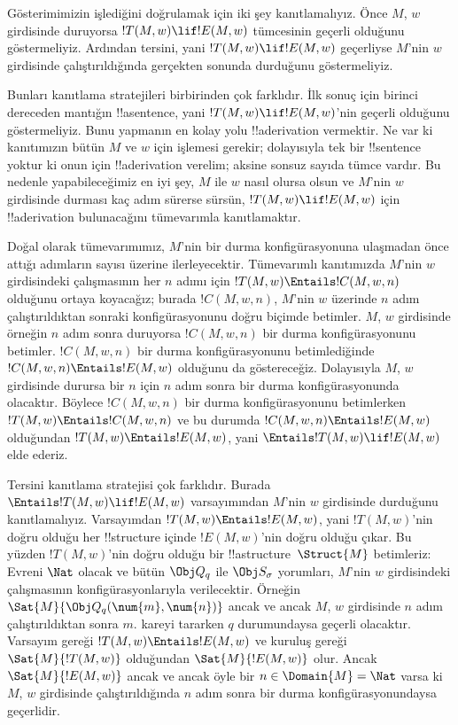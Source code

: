 \documentclass[../../../include/open-logic-section]{subfiles}
\begin{document}

\begin{explain}
Gösterimimizin işlediğini doğrulamak için iki şey kanıtlamalıyız. Önce $M$,
$w$ girdisinde duruyorsa $!T(M,w)\lif !E(M,w)$ tümcesinin geçerli olduğunu
göstermeliyiz. Ardından tersini, yani $!T(M,w)\lif !E(M,w)$ geçerliyse
$M$'nin $w$ girdisinde çalıştırıldığında gerçekten sonunda durduğunu
göstermeliyiz.

Bunları kanıtlama stratejileri birbirinden çok farklıdır. İlk sonuç için
birinci dereceden mantığın !!a{sentence}, yani $!T(M,w)\lif !E(M,w)$'nin
geçerli olduğunu göstermeliyiz. Bunu yapmanın en kolay yolu !!a{derivation}
vermektir. Ne var ki kanıtımızın bütün $M$ ve $w$ için işlemesi gerekir;
dolayısıyla tek bir !!{sentence} yoktur ki onun için !!a{derivation} verelim;
aksine sonsuz sayıda tümce vardır. Bu nedenle yapabileceğimiz en iyi şey,
$M$ ile
$w$ nasıl olursa olsun ve $M$'nin $w$ girdisinde durması kaç adım sürerse
sürsün, $!T(M,w)\lif !E(M,w)$ için !!a{derivation} bulunacağını tümevarımla
kanıtlamaktır.

Doğal olarak tümevarımımız, $M$'nin bir durma konfigürasyonuna ulaşmadan önce
attığı adımların sayısı üzerine ilerleyecektir. Tümevarımlı kanıtımızda
$M$'nin $w$ girdisindeki çalışmasının her $n$ adımı için
$!T(M,w)\Entails !C(M,w,n)$ olduğunu ortaya koyacağız; burada $!C(M,w,n)$,
$M$'nin $w$ üzerinde $n$ adım çalıştırıldıktan sonraki konfigürasyonunu doğru
biçimde betimler. $M$, $w$ girdisinde örneğin $n$ adım sonra duruyorsa
$!C(M,w,n)$ bir durma konfigürasyonunu betimler. $!C(M,w,n)$ bir durma
konfigürasyonunu betimlediğinde $!C(M,w,n)\Entails !E(M,w)$ olduğunu da
göstereceğiz. Dolayısıyla $M$, $w$ girdisinde durursa bir $n$ için $n$ adım
sonra bir durma konfigürasyonunda olacaktır. Böylece $!C(M,w,n)$ bir durma
konfigürasyonunu betimlerken $!T(M,w)\Entails !C(M,w,n)$ ve bu durumda
$!C(M,w,n)\Entails !E(M,w)$ olduğundan $!T(M,w)\Entails !E(M,w)$, yani
$\Entails !T(M,w)\lif !E(M,w)$ elde ederiz.

Tersini kanıtlama stratejisi çok farklıdır. Burada
$\Entails !T(M,w)\lif !E(M,w)$ varsayımından $M$'nin $w$ girdisinde durduğunu
kanıtlamalıyız. Varsayımdan $!T(M,w)\Entails !E(M,w)$, yani $!T(M,w)$'nin
doğru olduğu her !!{structure} içinde $!E(M,w)$'nin doğru olduğu çıkar.
Bu yüzden $!T(M,w)$'nin doğru olduğu bir !!a{structure}~$\Struct{M}$ betimleriz:
Evreni $\Nat$ olacak ve bütün $\Obj Q_q$ ile $\Obj S_\sigma$ yorumları,
$M$'nin $w$ girdisindeki çalışmasının konfigürasyonlarıyla verilecektir.
Örneğin $\Sat{M}{\Obj Q_q(\num{m},\num{n})}$ ancak ve ancak $M$, $w$
girdisinde $n$ adım çalıştırıldıktan sonra $m$. kareyi tararken $q$
durumundaysa geçerli olacaktır. Varsayım gereği
$!T(M,w)\Entails !E(M,w)$ ve kuruluş gereği $\Sat{M}{!T(M,w)}$ olduğundan
$\Sat{M}{!E(M,w)}$ olur. Ancak $\Sat{M}{!E(M,w)}$ ancak ve ancak öyle bir
$n\in\Domain{M}=\Nat$ varsa ki $M$, $w$ girdisinde
çalıştırıldığında $n$ adım sonra bir durma konfigürasyonundaysa geçerlidir.
\end{explain}
\end{document}
